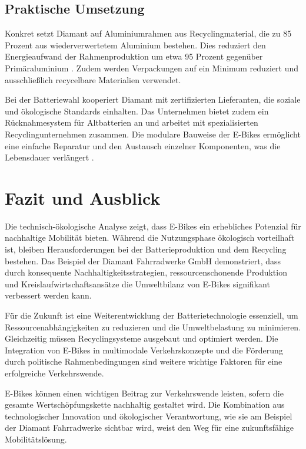 \documentclass[12pt,a4paper]{article}
\begin{document}
\subsection{Praktische Umsetzung}

Konkret setzt Diamant auf Aluminiumrahmen aus Recyclingmaterial, die zu 85 Prozent aus wiederverwertetem Aluminium bestehen. Dies reduziert den Energieaufwand der Rahmenproduktion um etwa 95 Prozent gegenüber Primäraluminium \cite{diamant2024}. Zudem werden Verpackungen auf ein Minimum reduziert und ausschließlich recycelbare Materialien verwendet.

Bei der Batteriewahl kooperiert Diamant mit zertifizierten Lieferanten, die soziale und ökologische Standards einhalten. Das Unternehmen bietet zudem ein Rücknahmesystem für Altbatterien an und arbeitet mit spezialisierten Recyclingunternehmen zusammen. Die modulare Bauweise der E-Bikes ermöglicht eine einfache Reparatur und den Austausch einzelner Komponenten, was die Lebensdauer verlängert \cite{diamant2024}.

\clearpage
\section{Fazit und Ausblick}

Die technisch-ökologische Analyse zeigt, dass E-Bikes ein erhebliches Potenzial für nachhaltige Mobilität bieten. Während die Nutzungsphase ökologisch vorteilhaft ist, bleiben Herausforderungen bei der Batterieproduktion und dem Recycling bestehen. Das Beispiel der Diamant Fahrradwerke GmbH demonstriert, dass durch konsequente Nachhaltigkeitsstrategien, ressourcenschonende Produktion und Kreislaufwirtschaftsansätze die Umweltbilanz von E-Bikes signifikant verbessert werden kann.

Für die Zukunft ist eine Weiterentwicklung der Batterietechnologie essenziell, um Ressourcenabhängigkeiten zu reduzieren und die Umweltbelastung zu minimieren. Gleichzeitig müssen Recyclingsysteme ausgebaut und optimiert werden. Die Integration von E-Bikes in multimodale Verkehrskonzepte und die Förderung durch politische Rahmenbedingungen sind weitere wichtige Faktoren für eine erfolgreiche Verkehrswende.

E-Bikes können einen wichtigen Beitrag zur Verkehrswende leisten, sofern die gesamte Wertschöpfungskette nachhaltig gestaltet wird. Die Kombination aus technologischer Innovation und ökologischer Verantwortung, wie sie am Beispiel der Diamant Fahrradwerke sichtbar wird, weist den Weg für eine zukunftsfähige Mobilitätslösung.
\end{document}
